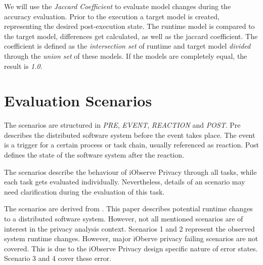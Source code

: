 We will use the \textit{Jaccard Coefficient} to evaluate model changes during the accuracy evaluation. Prior to the execution a target model is created, representing the desired post-execution state. The runtime model is compared to the target model, differences get calculated, as well as the jaccard coefficient. The coefficient is defined as the \textit{intersection set} of runtime and target model \textit{divided} through the \textit{union set} of these models. If the models are completely equal, the result is \textit{1.0}. 


\section{Evaluation Scenarios}
\label{sec:Evaluation:scenarios}

The scenarios are structured in \textit{PRE}, \textit{EVENT}, \textit{REACTION} and \textit{POST}. Pre describes the distributed software system before the event takes place. The event is a trigger for a certain process or task chain, usually referenced as reaction. Post defines the state of the software system after the reaction.

The scenarios describe the behaviour of iObserve Privacy through all tasks, while each task gets evaluated individually. Nevertheless, details of an scenario may need clarification during the evaluation of this task.

The scenarios are derived from \cite{Heinrich.2016b}. This paper describes potential runtime changes to a distributed software system. However, not all mentioned scenarios are of interest in the privacy analysis context. Scenarios 1 and 2 represent the observed system runtime changes. However, major iOberve privacy failing scenarios are not covered. This is due to the iObserve Privacy design specific nature of error states. Scenario 3 and 4 cover these error.

